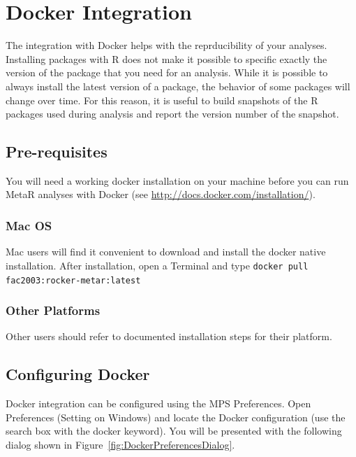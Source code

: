 

\chapter{Docker Integration}\label{chap:DockerIntegration}
The integration with Docker helps with the reprducibility of your analyses. Installing packages with R does not make it possible to specific exactly the version of the package that you need for an analysis. While it is possible to always install the latest version of a package, the behavior of some packages will change over time. For this reason, it is useful to build snapshots of the R packages used during analysis and report the version number of the snapshot. 

\section{Pre-requisites}
You will need a working docker installation on your machine before you can run MetaR analyses with Docker (see \url{http://docs.docker.com/installation/}).

\subsection{Mac OS}
Mac users will find it convenient to download and install the docker native installation. After installation, open a Terminal and type 
\texttt{docker pull fac2003:rocker-metar:latest} 

\subsection{Other Platforms}
Other users should refer to documented installation steps for their platform.

\section{Configuring Docker}
Docker integration can be configured using the MPS Preferences.  Open Preferences (Setting on Windows) and locate the Docker configuration (use the search box with the docker keyword). You will be presented with the following dialog shown in Figure~\ref{fig:DockerPreferencesDialog}.

